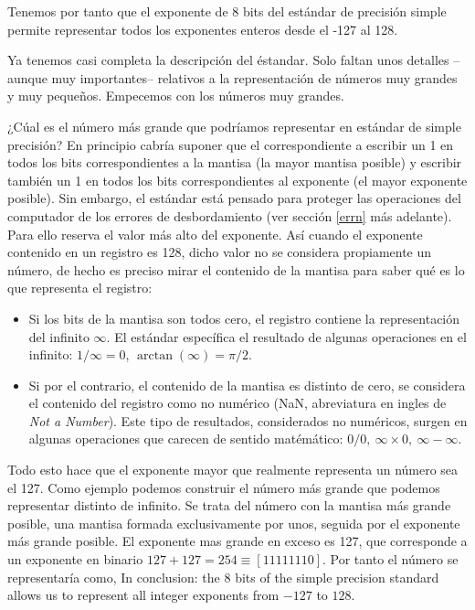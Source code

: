 \begin{paracol}{2}
Tenemos por tanto que el exponente de 8 bits del estándar de precisión simple permite representar todos los exponentes enteros desde el -127 al 128.

Ya tenemos casi completa la descripción del éstandar. Solo faltan unos detalles --aunque muy importantes-- relativos a la representación de números muy grandes y muy pequeños. Empecemos con los números muy grandes.

¿Cúal es el número más grande que podría\-mos representar en estándar de simple precisión? En principio cabría suponer que el correspondiente a escribir un 1 en todos los bits correspondientes a la mantisa (la mayor mantisa posible) y escribir también un 1 en todos los bits correspondientes al exponente (el mayor exponente posible). Sin embargo, el están\-dar está pensado para proteger las operaciones del computador de los errores de desbordamiento (ver sección \ref{errn} más adelante). Para ello reserva el valor más alto del exponente. Así cuando el exponente contenido en un registro es 128, dicho valor no se considera propiamente un número, de hecho es preciso mirar el contenido de la mantisa para saber qué es lo que representa el registro: 

\begin{itemize}
\item Si los bits de la mantisa son todos cero, el registro contiene la representación del infinito $\infty$.  El estándar específica el resultado de algunas operaciones en el infinito: $1/\infty=0$, $\arctan(\infty)=\pi/2$. 

\item {}  Si por el contrario, el contenido de la mantisa es distinto de cero, se considera el contenido del registro como no numérico (NaN, abreviatura en ingles de \emph{Not a Number}). Este tipo de resultados, considerados no numéricos, surgen en algunas operaciones que carecen de sentido matémático: $0/0, \ \infty\times0,\ \infty -\infty$. \end{itemize}

Todo esto hace que el exponente mayor que realmente representa un número sea el 127.  Como ejemplo podemos construir el número más grande que podemos representar distinto de infinito. Se trata del número con la mantisa más grande posible, una mantisa formada exclusivamente por unos, seguida por el exponente más grande posible. El exponente mas grande en exceso es 127, que corresponde a un exponente en binario $127+127=254 \equiv [11111110]$. Por tanto el número se representaría como,
\switchcolumn
In conclusion: the 8 bits of the simple precision standard allows us to represent all integer exponents from $-127$ to $128$. 


\end{paracol}
